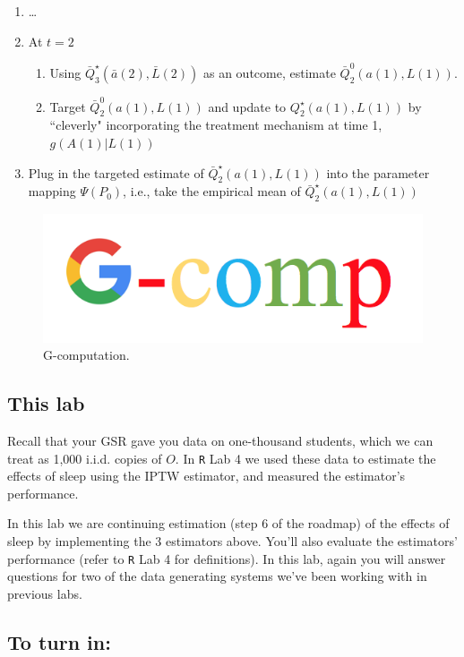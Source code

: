 \documentclass[answers]{exam}
\begin{document}
\begin{enumerate}
\begin{enumerate}
\begin{enumerate}
\end{enumerate}
\item \ldots
\item At $t = 2$
\begin{enumerate}
\item Using $\bar{Q}^\star_3(\bar{a}(2), \bar{L}(2))$ as an outcome, estimate $\bar{Q}^0_2(a(1), L(1))$.
\item Target $\bar{Q}^0_2(a(1), L(1))$ and update to $Q^\star_2(a(1), L(1))$ by ``cleverly" incorporating the treatment mechanism at time 1, $g(A(1)|L(1))$
\end{enumerate}
\item Plug in the targeted estimate of $\bar{Q}^\star_2(a(1), L(1))$ into the parameter mapping $\Psi(P_0)$, i.e., take the empirical mean of $\bar{Q}^\star_2(a(1), L(1))$

\end{enumerate}

\end{enumerate}

\begin{figure}
\begin{center}
\includegraphics[width=.4\textwidth]{Gcomp.png}
\caption{G-computation.}
\end{center}
\end{figure}

\subsection{This lab}

Recall that your GSR gave you data on one-thousand students, which we can treat as 1,000 i.i.d. copies of $O$. In \texttt{R} Lab 4 we used these data to estimate the effects of sleep using the IPTW estimator, and measured the estimator's performance. 

In this lab we are continuing estimation (step 6 of the roadmap) of the effects of sleep by implementing the 3 estimators above. You'll also evaluate the estimators' performance (refer to \texttt{R} Lab 4 for definitions). In this lab, again you will answer questions for two of the data generating systems we've been working with in previous labs. 

\subsection{To turn in:}
\end{document}
